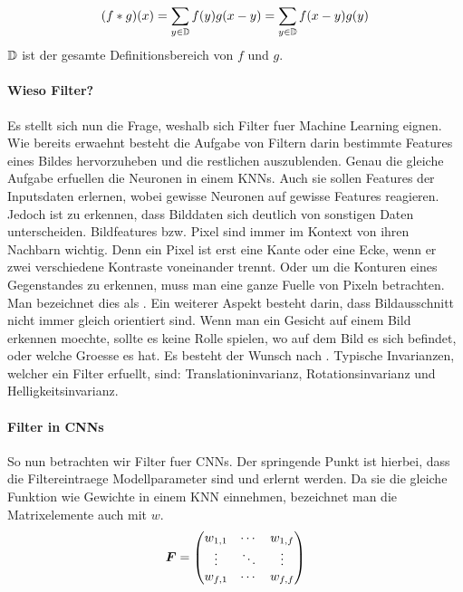 \documentclass[../main]{subfiles}
\begin{document}
\begin{equation}
  (f * g)(x) = \sum_{y \in \mathbb{D}} f(y)g(x-y) = \sum_{y \in \mathbb{D}} f(x-y)g(y)
\end{equation}
$\mathbb{D}$ ist der gesamte Definitionsbereich von $f$ und $g$.


\paragraph{Wieso Filter?}
Es stellt sich nun die Frage, weshalb sich Filter fuer Machine
Learning eignen.
Wie bereits erwaehnt besteht die Aufgabe von Filtern darin bestimmte Features
eines Bildes hervorzuheben und die restlichen auszublenden. Genau die gleiche
Aufgabe erfuellen die Neuronen in einem KNNs. Auch sie sollen Features der
Inputsdaten erlernen, wobei gewisse Neuronen auf gewisse Features reagieren.
\para{}
Jedoch ist zu erkennen, dass Bilddaten sich deutlich von sonstigen Daten unterscheiden.
Bildfeatures bzw. Pixel sind immer im Kontext von ihren Nachbarn wichtig. Denn
ein Pixel ist erst eine Kante oder eine Ecke, wenn er zwei verschiedene
Kontraste voneinander trennt. Oder um die Konturen eines Gegenstandes zu
erkennen, muss man eine ganze Fuelle von Pixeln betrachten. Man bezeichnet
dies als .
\para{}
Ein weiterer Aspekt besteht darin, dass Bildausschnitt nicht immer gleich
orientiert sind. Wenn man ein Gesicht auf einem Bild erkennen moechte, sollte es
keine Rolle spielen, wo auf dem Bild es sich befindet, oder welche Groesse es
hat. Es besteht der Wunsch nach . Typische Invarianzen,
welcher ein Filter erfuellt, sind: Translationinvarianz, Rotationsinvarianz und Helligkeitsinvarianz.

\paragraph{Filter in CNNs}
So nun betrachten wir Filter fuer CNNs. Der springende Punkt ist hierbei, dass
die Filtereintraege Modellparameter sind und erlernt werden. Da sie die gleiche
Funktion wie Gewichte in einem KNN einnehmen, bezeichnet man die Matrixelemente
auch mit $w$.
\begin{equation*}
  \bm{F} = \begin{pmatrix}
    w_{1,1} & \cdots & w_{1,f} \\
    \vdots & \ddots & \vdots \\
    w_{f,1} & \cdots & w_{f,f}
  \end{pmatrix}
\end{equation*}
\end{document}
